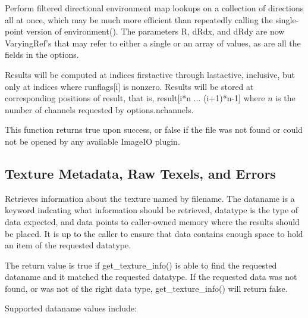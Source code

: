Perform filtered directional environment map lookups on a collection of
directions all at once, which may be much more efficient than repeatedly
calling the single-point version of {\cf environment()}.  The parameters
{\cf R}, {\cf dRdx}, and {\cf dRdy} are now {\cf VaryingRef}'s that may
refer to either a single or an array of values, as are all the fields in
the {\cf options}.

Results will be computed at indices {\cf firstactive} through
{\cf lastactive}, inclusive, but only at indices where {\cf runflags[i]}
is nonzero.  Results will be stored at corresponding positions of
{\cf result}, that is, {\cf result[i*n ... (i+1)*n-1]} where $n$ 
is the number of channels requested by {\cf options.nchannels}.

This function returns {\cf true} upon success, or {\cf false} if the
file was not found or could not be opened by any available ImageIO
plugin.
\apiend

\newpage
\subsection{Texture Metadata, Raw Texels, and Errors}
\label{sec:texturesys:api:gettextureinfo}
\label{sec:texturesys:api:getimagespec}
\label{sec:texturesys:api:geterror}


Retrieves information about the texture named by {\cf filename}.
The {\cf dataname} is a keyword indcating what information should
be retrieved, {\cf datatype} is the type of data expected, and
{\cf data} points to caller-owned memory where the results should be
placed.  It is up to the caller to ensure that {\cf data} contains
enough space to hold an item of the requested {\cf datatype}.

The return value is {\cf true} if {\cf get_texture_info()} is able
to find the requested {\cf dataname} and it matched the requested
{\cf datatype}.  If the requested data was not found, or was not
of the right data type, {\cf get_texture_info()} will return {\cf false}.

Supported {\cf dataname} values include:


